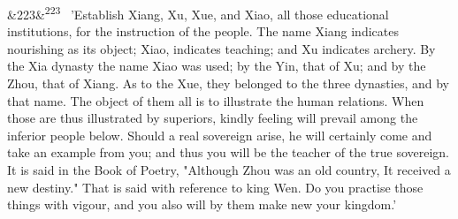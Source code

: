 \documentclass[12pt]{article}
\newcommand{\para}[1][]{\par\noindent\ifx&#1&\else\textsuperscript{\footnotesize #1}~\fi}
\begin{document}
\para[223] 'Establish Xiang, Xu, Xue, and Xiao, all those educational institutions, for the instruction of the people. The name Xiang indicates nourishing as its object; Xiao, indicates teaching; and Xu indicates archery. By the Xia dynasty the name Xiao was used; by the Yin, that of Xu; and by the Zhou, that of Xiang. As to the Xue, they belonged to the three dynasties, and by that name. The object of them all is to illustrate the human relations. When those are thus illustrated by superiors, kindly feeling will prevail among the inferior people below. Should a real sovereign arise, he will certainly come and take an example from you; and thus you will be the teacher of the true sovereign. It is said in the Book of Poetry, "Although Zhou was an old country, It received a new destiny." That is said with reference to king Wen. Do you practise those things with vigour, and you also will by them make new your kingdom.'
\end{document}
